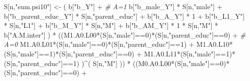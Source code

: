 \documentclass[
]{book}
\newenvironment{Shaded}{\begin{snugshade}}{\end{snugshade}}
\newcommand{\CommentTok}[1]{\textcolor[rgb]{0.56,0.35,0.01}{\textit{#1}}}
\newcommand{\DecValTok}[1]{\textcolor[rgb]{0.00,0.00,0.81}{#1}}
\newcommand{\NormalTok}[1]{#1}
\newcommand{\OtherTok}[1]{\textcolor[rgb]{0.56,0.35,0.01}{#1}}
\newcommand{\SpecialCharTok}[1]{\textcolor[rgb]{0.00,0.00,0.00}{#1}}
\newcommand{\StringTok}[1]{\textcolor[rgb]{0.31,0.60,0.02}{#1}}
\begin{document}
\begin{Shaded}
\begin{Highlighting}[]
\NormalTok{    S[n,}\StringTok{"sum.psi10"}\NormalTok{] }\OtherTok{\textless{}{-}}\NormalTok{  ( b[}\StringTok{"b\_Y"}\NormalTok{] }\SpecialCharTok{+}                                           \CommentTok{\# A=1}
\NormalTok{                             b[}\StringTok{"b\_male\_Y"}\NormalTok{] }\SpecialCharTok{*}\NormalTok{ S[n,}\StringTok{"male"}\NormalTok{] }\SpecialCharTok{+} 
\NormalTok{                             b[}\StringTok{"b\_parent\_educ\_Y"}\NormalTok{] }\SpecialCharTok{*}\NormalTok{ S[n,}\StringTok{"parent\_educ"}\NormalTok{] }\SpecialCharTok{+} 
\NormalTok{                             b[}\StringTok{"b\_A\_Y"}\NormalTok{] }\SpecialCharTok{*} \DecValTok{1} \SpecialCharTok{+} 
\NormalTok{                             b[}\StringTok{"b\_L1\_Y"}\NormalTok{] }\SpecialCharTok{*}\NormalTok{ S[n,}\StringTok{"L1"}\NormalTok{] }\SpecialCharTok{+}
\NormalTok{                             b[}\StringTok{"b\_M\_Y"}\NormalTok{] }\SpecialCharTok{*}\NormalTok{ S[n,}\StringTok{"M"}\NormalTok{] }\SpecialCharTok{+}
\NormalTok{                             b[}\StringTok{"b\_AM\_Y"}\NormalTok{] }\SpecialCharTok{*} \DecValTok{1} \SpecialCharTok{*}\NormalTok{ S[n,}\StringTok{"M"}\NormalTok{] }\SpecialCharTok{*}\NormalTok{ b[}\StringTok{"A.M.inter"}\NormalTok{] ) }\SpecialCharTok{*}
\NormalTok{      ((M1.A0.L00}\SpecialCharTok{*}\NormalTok{(S[n,}\StringTok{"male"}\NormalTok{]}\SpecialCharTok{==}\DecValTok{0}\NormalTok{)}\SpecialCharTok{*}\NormalTok{(S[n,}\StringTok{"parent\_educ"}\NormalTok{]}\SpecialCharTok{==}\DecValTok{0}\NormalTok{) }\SpecialCharTok{+}                    \CommentTok{\# A\textquotesingle{}=0}
\NormalTok{          M1.A0.L01}\SpecialCharTok{*}\NormalTok{(S[n,}\StringTok{"male"}\NormalTok{]}\SpecialCharTok{==}\DecValTok{0}\NormalTok{)}\SpecialCharTok{*}\NormalTok{(S[n,}\StringTok{"parent\_educ"}\NormalTok{]}\SpecialCharTok{==}\DecValTok{1}\NormalTok{) }\SpecialCharTok{+}
\NormalTok{          M1.A0.L10}\SpecialCharTok{*}\NormalTok{(S[n,}\StringTok{"male"}\NormalTok{]}\SpecialCharTok{==}\DecValTok{1}\NormalTok{)}\SpecialCharTok{*}\NormalTok{(S[n,}\StringTok{"parent\_educ"}\NormalTok{]}\SpecialCharTok{==}\DecValTok{0}\NormalTok{) }\SpecialCharTok{+} 
\NormalTok{          M1.A0.L11}\SpecialCharTok{*}\NormalTok{(S[n,}\StringTok{"male"}\NormalTok{]}\SpecialCharTok{==}\DecValTok{1}\NormalTok{)}\SpecialCharTok{*}\NormalTok{(S[n,}\StringTok{"parent\_educ"}\NormalTok{]}\SpecialCharTok{==}\DecValTok{1}\NormalTok{) )}\SpecialCharTok{\^{}}\NormalTok{( S[n,}\StringTok{"M"}\NormalTok{] )) }\SpecialCharTok{*}
\NormalTok{      ((M0.A0.L00}\SpecialCharTok{*}\NormalTok{(S[n,}\StringTok{"male"}\NormalTok{]}\SpecialCharTok{==}\DecValTok{0}\NormalTok{)}\SpecialCharTok{*}\NormalTok{(S[n,}\StringTok{"parent\_educ"}\NormalTok{]}\SpecialCharTok{==}\DecValTok{0}\NormalTok{) }\SpecialCharTok{+}                

\end{Highlighting}
\end{Shaded}
\end{document}

